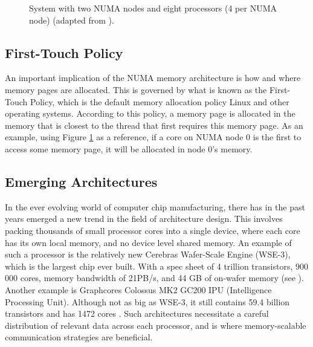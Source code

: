 \begin{figure}[H]
    \centering
    \caption{System with two NUMA nodes and eight processors (4 per NUMA node) (adapted from \cite{10.1145/2508834.2513149}).}
    \label{fig:numanode}
\end{figure}


\subsection{First-Touch Policy}
\label{sec:firstouch}
An important implication of the NUMA memory architecture is how and where memory pages are allocated. This is governed by what is known as the First-Touch Policy, which is the default memory allocation policy Linux and other operating systems. According to this policy, a memory page is allocated in the memory that is closest to the thread that first requires this memory page. As an example, using Figure \ref{fig:numanode} as a reference, if a core on NUMA node 0 is the first to access some memory page, it will be allocated in node 0's memory.

\subsection{Emerging Architectures}
In the ever evolving world of computer chip manufacturing, there has in the past years emerged a new trend in the field of architecture design. This involves packing thousands of small processor cores into a single device, where each core has its own local memory, and no device level shared memory. An example of such a processor is the relatively new Cerebras Wafer-Scale Engine (WSE-3), which is the largest chip ever built. With a spec sheet of 4 trillion transistors, 900 000 cores, memory bandwidth of 21PB/s, and 44 GB of on-wafer memory (see \cite{cerebras2024wse3}). Another example is Graphcores Colossus MK2 GC200 IPU (Intelligence Processing Unit). Although not as big as WSE-3, it still contains 59.4 billion transistors and has 1472 cores \cite{graphcore_ipu}. Such architectures necessitate a careful distribution of relevant data across each processor, and is where memory-scalable communication strategies are beneficial. 
\medskip

